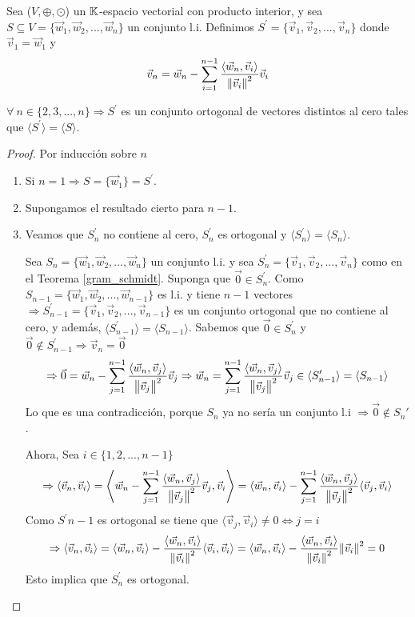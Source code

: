 \begin{theorem} 
    \label{gram_schmidt}
   Sea  ($V, \oplus, \odot$) un $\mathbb{K}$-espacio vectorial con producto interior, y sea $S \subseteq V=\{\vec{w}_1,\vec{w}_2,...,\vec{w}_n\}$ un conjunto l.i. Definimos ${S}^{\prime}=\{\vec{v}_1,\vec{v}_2,...,\vec{v}_n\}$ donde $\vec{v}_1=\vec{w}_1$ y 
   $$\vec{v}_n=\vec{w}_n-\sum_{i=1}^{n-1}\frac{\langle \vec{w}_n,\vec{v}_i \rangle}{\norm{\vec{v}_i}^2}\vec{v}_i $$ 
   
   $\forall \: n \in \{2,3,...,n\}  \Rightarrow {S}^{\prime}$ es un conjunto ortogonal de vectores distintos al cero tales que $\langle {S}^{\prime} \rangle= \langle S \rangle$. 
\end{theorem}

\begin{proof}
 Por inducción sobre $n$
\begin{enumerate}
    \item Si $n=1 \Rightarrow S=\{\vec{w}_1\}={S}^{\prime}$.
    \item Supongamos el resultado cierto para $n-1$.
    \item Veamos que ${S}^{\prime}_n$ no contiene al cero, ${S}^{\prime}_n$ es ortogonal y $\langle {S}^{\prime}_n \rangle=\langle S_n \rangle$. 
    
    Sea $S_n=\{\vec{w}_1,\vec{w}_2,...,\vec{w}_n\}$ un conjunto l.i. y sea ${S}^{\prime}_n=\{\vec{v}_1,\vec{v}_2,...,\vec{v}_n\}$ como en el Teorema \ref{gram_schmidt}. Suponga que $\vec{0} \in {S}^{\prime}_n$. Como $S_{n-1}=\{\vec{w}_1,\vec{w}_2,...,\vec{w}_{n-1}\}$ es l.i. y tiene $n-1$ vectores $\Rightarrow {S}^{\prime}_{n-1}=\{\vec{v}_1,\vec{v}_2,...,\vec{v}_{n-1}\}$ es un conjunto ortogonal que no contiene al cero, y además, $\langle {S}^{\prime}_{n-1} \rangle= \langle S_{n-1} \rangle$. Sabemos que $\vec{0} \in {S}^{\prime}_n $ y $ \vec{0} \notin {S}^{\prime}_{n-1} \Rightarrow \vec{v}_n=\vec{0}$ $$\Rightarrow \vec{0}=\vec{w}_n-\sum_{j=1}^{n-1}\frac{\langle \vec{w}_n,\vec{v}_j \rangle}{\norm{\vec{v}_j}^2}\vec{v}_j \\
   \Rightarrow \vec{w}_n=\sum_{j=1}^{n-1}\frac{\langle \vec{w}_n,\vec{v}_j \rangle}{\norm{\vec{v}_j}^2}\vec{v}_j\in \langle {S}^{\prime}_{n-1}\rangle=\langle S_{n-1} \rangle$$ Lo que es una contradicción, porque $S_n$ ya no sería un conjunto l.i $\Rightarrow \vec{0} \notin S_n'$.

   Ahora, Sea $i\in\{1,2,...,n-1\}$ $$\Rightarrow \langle \vec{v}_n, \vec{v}_i \rangle= \left\langle \vec{w}_n-\sum_{j=1}^{n-1}\frac{\langle \vec{w}_n,\vec{v}_j \rangle}{\norm{\vec{v}_j}^2}\vec{v}_j, \vec{v}_i \right\rangle=\langle \vec{w}_n, \vec{v}_i \rangle -\sum_{j=1}^{n-1}\frac{\langle \vec{w}_n,\vec{v}_j \rangle}{\norm{\vec{v}_j}^2} \langle \vec{v}_j, \vec{v}_i \rangle$$ Como ${S}^{\prime}{n-1}$ es ortogonal se tiene que $\langle \vec{v}_j, \vec{v}_i \rangle \neq 0 \iff j=i$
   $$ \Rightarrow \langle \vec{v}_n, \vec{v}_i \rangle=\langle \vec{w}_n, \vec{v}_i \rangle -\frac{\langle \vec{w}_n,\vec{v}_i \rangle}{\norm{\vec{v}_i}^2} \langle \vec{v}_i, \vec{v}_i \rangle=\langle \vec{w}_n, \vec{v}_i \rangle -\frac{\langle \vec{w}_n,\vec{v}_i \rangle}{\norm{\vec{v}_i}^2}\norm{\vec{v}_i}^2=0$$ Esto implica que ${S}^{\prime}_n$ es ortogonal.


\end{enumerate}
\end{proof}
